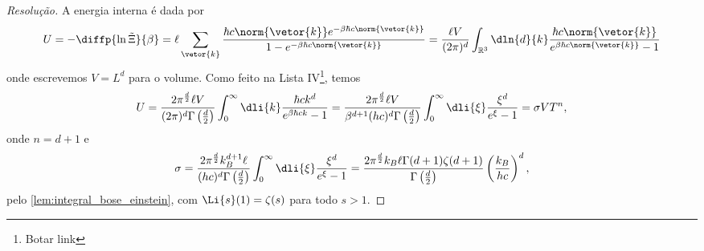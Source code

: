 \begin{proof}[Resolução]
    A energia interna é dada por
    \begin{equation*}
        U = - \diffp{\ln \tilde\Xi}{\beta} = \ell \sum_{\vetor{k}} \frac{\hbar c \norm{\vetor{k}} e^{-\beta \hbar c \norm{\vetor{k}}}}{1 - e^{-\beta \hbar c \norm{\vetor{k}}}} = \frac{\ell V}{(2\pi)^d} \int_{\mathbb{R}^3}\dln{d}{k} \frac{\hbar c \norm{\vetor{k}}}{e^{\beta \hbar c \norm{\vetor{k}}}-1}
    \end{equation*}
    onde escrevemos \(V = L^d\) para o volume. Como feito na Lista IV\footnote{Botar link}, temos
    \begin{equation*}
        U = \frac{2\pi^{\frac{d}{2}}\ell V}{(2\pi)^d \Gamma\left(\frac{d}{2}\right)} \int_0^\infty \dli{k} \frac{\hbar c k^d}{e^{\beta \hbar c k}-1} = \frac{2\pi^{\frac{d}{2}} \ell V}{\beta^{d + 1}(h c)^d \Gamma\left(\frac{d}{2}\right)} \int_0^\infty \dli{\xi} \frac{\xi^d}{e^\xi - 1} = \sigma V T^{n},
    \end{equation*}
    onde \(n = d + 1\) e
    \begin{equation*}
        \sigma = \frac{2\pi^{\frac{d}{2}} k_B^{d + 1}\ell}{(hc)^d \Gamma\left(\frac{d}{2}\right)}\int_0^\infty \dli{\xi} \frac{\xi^d}{e^{\xi} - 1} = \frac{2\pi^{\frac{d}{2}}k_B \ell \Gamma(d + 1) \zeta(d + 1)}{\Gamma\left(\frac{d}{2}\right)} \left(\frac{k_B}{hc}\right)^d,
    \end{equation*}
    pelo \cref{lem:integral_bose_einstein}, com \(\Li{s}(1) = \zeta(s)\) para todo \(s > 1\).
\end{proof}
